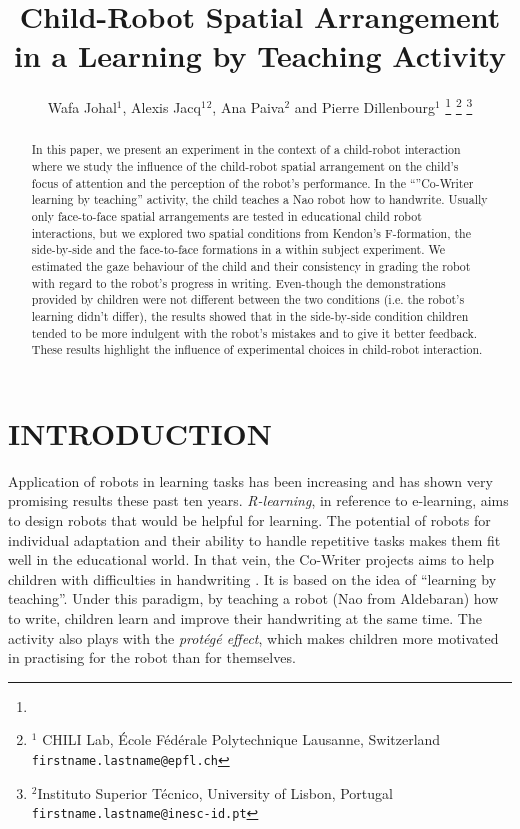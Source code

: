 \documentclass[letterpaper, 10 pt, conference]{ieeeconf}  %
\title{\LARGE \bf
Child-Robot Spatial Arrangement in a Learning by Teaching Activity}
\author{Wafa Johal$^{1}$, Alexis Jacq$^{1}$$^{2}$, Ana Paiva$^{2}$ and Pierre Dillenbourg$^{1}$  %
\thanks{}%
\thanks{$^{1}$ CHILI Lab,
        École Fédérale Polytechnique Lausanne, Switzerland
        {\tt\small firstname.lastname@epfl.ch}}%
\thanks{$^{2}$Instituto Superior T\'{e}cnico, University of Lisbon, Portugal
        {\tt\small firstname.lastname@inesc-id.pt}}%
}
\begin{document}
\maketitle


\begin{abstract}
In this paper, we present an experiment in the context of a child-robot interaction where we study the influence of the child-robot spatial arrangement on the child's focus of attention and the perception of the robot's performance. In the ``''Co-Writer learning by teaching'' activity, the child teaches a Nao robot how to handwrite.
Usually only face-to-face spatial arrangements are tested in educational child robot interactions, but we explored two spatial conditions from Kendon's F-formation, the side-by-side and the face-to-face formations in a within subject experiment.
We estimated the gaze behaviour of the child and their consistency in grading the robot with regard to the robot's progress in writing. 
Even-though the demonstrations provided by children were not different between the two conditions (i.e. the robot's learning didn't differ),  the results showed that in the side-by-side condition children tended to be more indulgent with the robot's mistakes and to give it better feedback.
These results highlight the influence of experimental choices in child-robot interaction.
\end{abstract}


\section{INTRODUCTION}

Application of robots in learning tasks has been increasing and has shown very promising results these past ten years. 
\emph{R-learning}, in reference to e-learning, aims to design robots that would be helpful for learning.
The potential of robots for individual adaptation and their ability to handle repetitive tasks makes them fit well in the educational world.
In that vein, the Co-Writer projects aims to help children with difficulties in handwriting \cite{hood2015when}.
It is based on the idea of ``learning by teaching''.
Under this paradigm, by teaching a robot (Nao from Aldebaran) how to write, children learn and improve their handwriting at the same time.
The activity also plays with the \emph{protégé effect}, which makes children more motivated in practising for the robot than for themselves.
\end{document}
